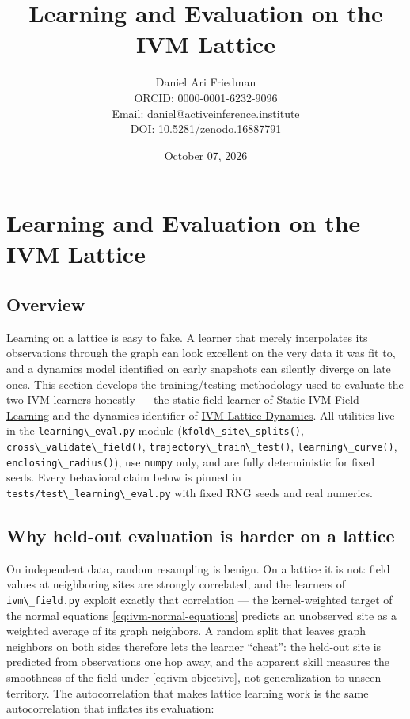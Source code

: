 \documentclass[
  10pt,
]{article}
\title{Learning and Evaluation on the IVM Lattice}
\author{Daniel Ari Friedman\\ ORCID: 0000-0001-6232-9096\\ Email: daniel@activeinference.institute\\ DOI: 10.5281/zenodo.16887791}
\date{October 07, 2026}
\newcommand{\passthrough}[1]{#1}
\begin{document}
\maketitle

{
\hypersetup{linkcolor=black}
\setcounter{tocdepth}{3}
\tableofcontents
}
\section{Learning and Evaluation on the IVM
Lattice}\label{learning-and-evaluation-on-the-ivm-lattice}

\subsection{Overview}\label{overview}

Learning on a lattice is easy to fake. A learner that merely
interpolates its observations through the graph can look excellent on
the very data it was fit to, and a dynamics model identified on early
snapshots can silently diverge on late ones. This section develops the
training/testing methodology used to evaluate the two IVM learners
honestly --- the static field learner of
\href{11_ivm_field_learning.md}{Static IVM Field Learning} and the
dynamics identifier of \href{12_ivm_dynamics.md}{IVM Lattice Dynamics}.
All utilities live in the \passthrough{\lstinline!learning\_eval.py!}
module (\passthrough{\lstinline!kfold\_site\_splits()!},
\passthrough{\lstinline!cross\_validate\_field()!},
\passthrough{\lstinline!trajectory\_train\_test()!},
\passthrough{\lstinline!learning\_curve()!},
\passthrough{\lstinline!enclosing\_radius()!}), use
\passthrough{\lstinline!numpy!} only, and are fully deterministic for
fixed seeds. Every behavioral claim below is pinned in
\passthrough{\lstinline!tests/test\_learning\_eval.py!} with fixed RNG
seeds and real numerics.

\subsection{Why held-out evaluation is harder on a
lattice}\label{why-held-out-evaluation-is-harder-on-a-lattice}

On independent data, random resampling is benign. On a lattice it is
not: field values at neighboring sites are strongly correlated, and the
learners of \passthrough{\lstinline!ivm\_field.py!} exploit exactly that
correlation --- the kernel-weighted target of the normal equations
\eqref{eq:ivm-normal-equations} predicts an unobserved site as a
weighted average of its graph neighbors. A random split that leaves
graph neighbors on both sides therefore lets the learner ``cheat'': the
held-out site is predicted from observations one hop away, and the
apparent skill measures the smoothness of the field under
\eqref{eq:ivm-objective}, not generalization to unseen territory. The
autocorrelation that makes lattice learning work is the same
autocorrelation that inflates its evaluation:
\end{document}
